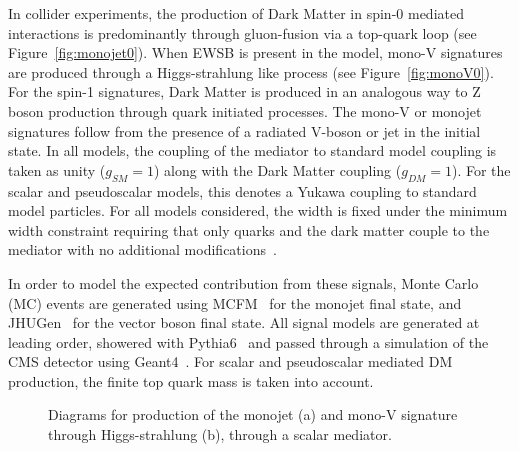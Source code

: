 In collider experiments, the production of Dark Matter in spin-0 mediated
interactions is predominantly through gluon-fusion via a top-quark loop (see
Figure~\ref{fig:monojet0}).  When EWSB is present in the model, mono-V
signatures are produced through a Higgs-strahlung like process (see
Figure~\ref{fig:monoV0}). For the spin-1 signatures, Dark Matter is produced in
an analogous way to Z boson production through quark initiated processes. The
mono-V or monojet signatures follow from the presence of a radiated V-boson or
jet in the initial state. In all models, the coupling of the mediator to
standard model coupling is taken as unity ($g_{SM}=1$) along with the Dark
Matter coupling ($g_{DM}=1$). For the scalar and pseudoscalar models, this
denotes a Yukawa coupling to standard model particles. For all models
considered, the width is fixed under the minimum width constraint requiring that
only quarks and the dark matter couple to the mediator with no additional
modifications~\cite{Harris:2014hga}.

In order to model the expected contribution from these signals, Monte Carlo (MC)
events are generated using MCFM~\cite{mcfm} for the monojet final state, and
JHUGen~\cite{Anderson:2013afp} for the vector boson final state. All signal
models are generated at leading order, showered with
Pythia6~\cite{Sjostrand:2006za} and passed through a simulation of the CMS
detector using Geant4~\cite{geant4}.  For scalar and pseudoscalar mediated DM
production, the finite top quark mass is taken into account. 

\begin{figure}[htbp] \centering {}  \caption{Diagrams for production of the monojet (a) and
mono-V signature through Higgs-strahlung (b), through a scalar
mediator.\label{fig:monoXfeyn}} \end{figure}



